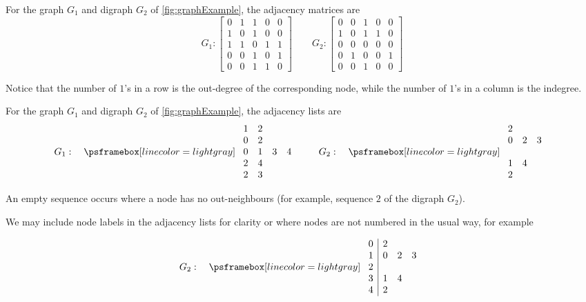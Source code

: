 \begin{Example}
For the graph $G_1$ and digraph $G_2$ of \cref{fig:graphExample}, the adjacency matrices are
$$
G_1: 
\left[
\begin{matrix}
0 & 1 & 1 & 0 & 0 \\
1 & 0 & 1 & 0 & 0 \\
1 & 1 & 0 & 1 & 1 \\
0 & 0 & 1 & 0 & 1 \\
0 & 0 & 1 & 1 & 0 
\end{matrix}
\right]
\qquad 
G_2: 
\left[
\begin{matrix}
0 & 0 & 1 & 0 & 0 \\
1 & 0 & 1 & 1 & 0 \\
0 & 0 & 0 & 0 & 0 \\
0 & 1 & 0 & 0 & 1 \\
0 & 0 & 1 & 0 & 0 
\end{matrix}
\right]
$$

Notice that the number of $1$'s in a row is the out-degree of the corresponding node, 
while the number of $1$'s in a column is the indegree.
\end{Example}
 
\begin{Example}
For the graph $G_1$ and digraph $G_2$ of \cref{fig:graphExample}, 
the adjacency lists are
$$
G_1: \quad
\AdjLists{
\begin{array}{cccc}
1 & 2  \\
0 & 2 \\
0 & 1 & 3 & 4  \\
2 & 4  \\
2 & 3  \\
\end{array}
}
 \qquad
G_2: 
\quad 
\AdjLists{
\begin{array}{ccc}
2  \\
0 & 2 & 3  \\
\\
1 & 4  \\
2 \\
\end{array}
}
$$

An empty sequence occurs where a node has no out-neighbours (for example, sequence $2$ of the digraph $G_2$). 

We may include node labels in the adjacency lists for clarity or where nodes are not numbered in the usual way, for example

$$
G_2: 
\quad 
\AdjLists{
\begin{array}{c|ccc}
0 & 2  \\
1 & 0 & 2 & 3  \\
2  \\
3 & 1 & 4  \\
4 & 2 \\
\end{array}
}
$$
\end{Example}


